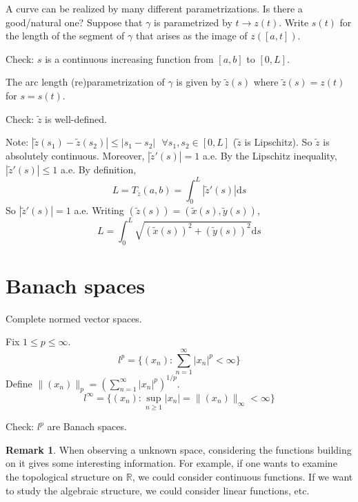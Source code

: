 \documentclass{article}
\theoremstyle{definition}
\newtheorem{rem}{Remark}
\newcommand{\sfa}{\text{  } \forall}
\begin{document}
A curve can be realized by many different parametrizations. Is there a good/natural one? Suppose that $\gamma$ is parametrized by $t \to z(t)$. Write $s(t)$ for the length of the segment of $\gamma$ that arises as the image of $z([a, t])$. 

\par Check: $s$ is a continuous increasing function from $[a, b]$ to $[0, L]$. 

\par The arc length (re)parametrization of $\gamma$ is given by $\tilde{z}(s)$ where $\tilde{z}(s) = z(t)$ for $s = s(t)$. 

\par Check: $\tilde{z}$ is well-defined. 

\par Note: $|\tilde{z}(s_1) - \tilde{z}(s_2)| \leq |s_1 - s_2| \sfa s_1, s_2 \in [0, L]$ ($\tilde{z}$ is Lipschitz). So $\tilde{z}$ is absolutely continuous. Moreover, $|\tilde{z}'(s)| = 1$ a.e. By the Lipschitz inequality, $|\tilde{z}'(s)| \leq 1$ a.e. By definition, 
\[
  L = T_{\tilde{z}}(a, b) = \int_0^L |\tilde{z}'(s)| \mathrm{d} s
\]
So $|\tilde{z}'(s)| = 1$ a.e. Writing $(\tilde{z}(s)) = (\tilde{x}(s), \tilde{y}(s))$, 
\[
  L = \int_0^L \sqrt{(\tilde{x}(s))^2 + (\tilde{y}(s))^2} \mathrm{d} s
\]

\section{Banach spaces}

\par Complete normed vector spaces. 

\par Fix $1 \leq p \leq \infty$. 
\[
  l^p = \{(x_n): \sum_{n = 1}^\infty |x_n|^p < \infty \}
\]
Define $\|(x_n)\|_{p} = (\sum_{n = 1}^\infty |x_n|^p)^{1/p}$. 
\[
  l^\infty = \{(x_n): \sup_{n \geq 1} |x_n| = \|(x_n)\|_{\infty} < \infty\}
\]

\par Check: $l^p$ are Banach spaces.

\begin{rem}
  When observing a unknown space, considering the functions building on it gives some interesting information. For example, if one wants to examine the topological structure on $\mathbb{R}$, we could consider continuous functions. If we want to study the algebraic structure, we could consider linear functions, etc. 
\end{rem}
\end{document}
